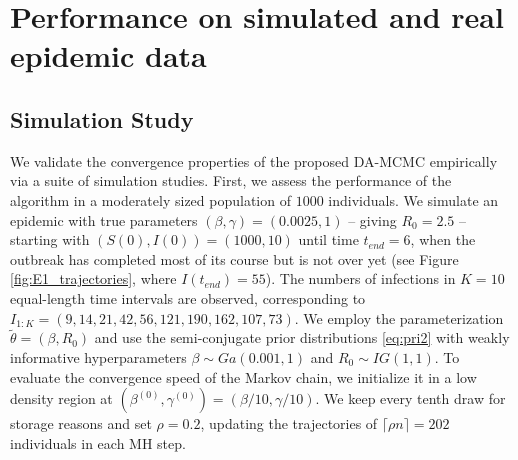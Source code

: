\documentclass[11pt]{article}
\begin{document}
	
	\section{Performance on simulated and real epidemic data}
	\label{sec:per}
	
	\subsection{Simulation Study}
	\label{sec:sim}
	
	We validate the convergence properties of the proposed DA-MCMC empirically via a suite of simulation studies. First, we assess the performance of the algorithm in a moderately sized population of $1000$ individuals. We simulate an epidemic with true parameters $(\beta, \gamma) = (0.0025, 1)$ -- giving $R_0 = 2.5$ -- starting with $(S(0), I(0)) = (1000, 10)$ until time $t_{end} = 6$, when the outbreak has completed most of its course but is not over yet (see Figure \ref{fig:E1_trajectories}, where $I(t_{end}) = 55$). The numbers of infections in $K = 10$ equal-length time intervals are observed, corresponding to $I_{1:K} = (9, 14, 21, 42, 56, 121, 190, 162, 107, 73)$.	
	We employ the parameterization $\tilde{\theta} = (\beta, R_0)$ and use the semi-conjugate prior distributions \eqref{eq:pri2} with weakly informative hyperparameters $\beta \sim Ga(0.001, 1)$ and $R_0 \sim IG(1,1)$.
	To evaluate the convergence speed of the Markov chain, we initialize it in a low density region at $\left(\beta^{(0)}, \gamma^{(0)}\right) = \left(\beta/10, \gamma/10\right)$. We keep every tenth draw for storage reasons and set $\rho = 0.2$, updating the trajectories of $\lceil\rho n\rceil = 202$ individuals in each MH step.
	
\end{document}
